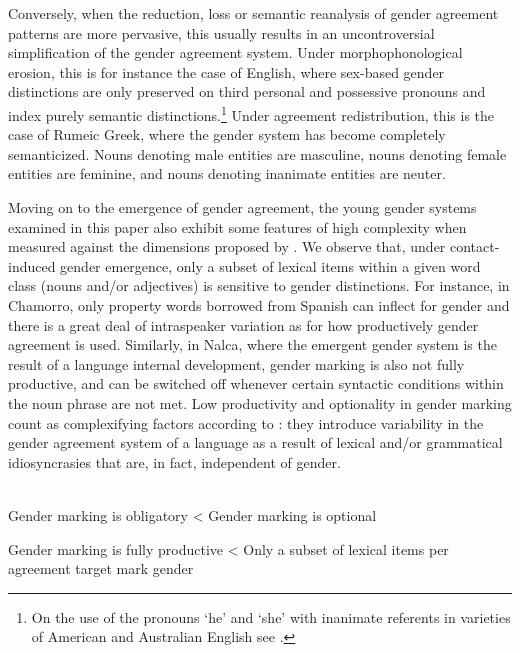 \documentclass[output=collectionpaper]{langsci/langscibook}
\begin{document}
Conversely, when the reduction, loss or semantic reanalysis of gender agreement patterns are more pervasive, this usually results in an uncontroversial simplification of the gender agreement system. Under morphophonological erosion, this is for instance the case of English, where sex-based gender distinctions are only preserved on third personal and possessive pronouns and index purely semantic distinctions.\footnote{On the use of the pronouns `he' and `she' with inanimate referents in varieties of American and Australian English see \citet{Pawley2004}.}  Under agreement redistribution, this is the case of Rumeic Greek, where the gender system has become completely semanticized. Nouns denoting male entities are masculine, nouns denoting female entities are feminine, and nouns denoting inanimate entities are neuter.

Moving on to the emergence of gender agreement, the young gender systems examined in this paper also exhibit some features of high complexity when measured against the dimensions proposed by \citet{Audring2017}.  We observe that, under contact-induced gender emergence, only a subset of lexical items within a given word class (nouns and/or adjectives) is sensitive to
gender distinctions. For instance, in Chamorro, only property words borrowed from Spanish can inflect for gender and there is a great deal of intraspeaker variation as for how productively gender agreement is used. Similarly, in Nalca, where the emergent gender system is the result of a language internal development, gender marking is also not fully productive, and can be switched off whenever certain syntactic conditions within the noun phrase are not met.  Low productivity and optionality in gender marking count as complexifying factors according to \citet{Audring2017}: they introduce variability in the gender agreement system of a language as a result of lexical and/or grammatical idiosyncrasies that are, in fact, independent of gender.


\ea\label{ex:dgm:13:Audring4}
\\

\vspace{3mm}
Gender marking is obligatory {\textless} Gender marking is optional

\vspace{3mm}
Gender marking is fully productive  {\textless} Only a subset of lexical items per agreement target mark gender

\z
\end{document}
